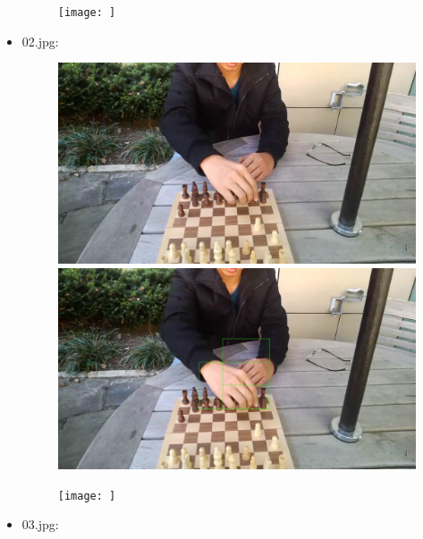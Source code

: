 \begin{itemize}
\begin{figure}[!htb]
\begin{minipage}{0.33\textwidth}
                \centering
                \texttt{[image: ]}
            \end{minipage}
        \end{figure}
    \item 02.jpg:
        \begin{figure}[!htb]
            \begin{minipage}{0.33\textwidth}
            \centering
            \includegraphics[scale = 0.135]{images/results/original/02.jpg}
            \end{minipage}\hfill
            \begin{minipage}{0.33\textwidth}
                \centering
                \includegraphics[scale = 0.135]{images/results/detection/02_detections.jpg}
            \end{minipage}\hfill
            \begin{minipage}{0.33\textwidth}
                \centering
                \texttt{[image: ]}
            \end{minipage}
        \end{figure}
    \item 03.jpg:

\end{itemize}

